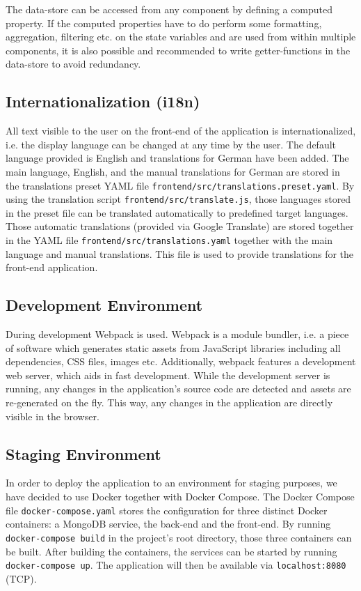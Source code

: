 The data-store can be accessed from any component by defining a computed property. If the computed properties have to do perform some formatting, aggregation, filtering etc. on the state variables and are used from within multiple components, it is also possible and recommended to write getter-functions in the data-store to avoid redundancy.

\subsection{Internationalization (i18n)}

All text visible to the user on the front-end of the application is internationalized, i.e. the display language can be changed at any time by the user. The default language provided is English and translations for German have been added. The main language, English, and the manual translations for German are stored in the translations preset YAML file \texttt{frontend/src/translations.preset.yaml}. By using the translation script \texttt{frontend/src/translate.js}, those languages stored in the preset file can be translated automatically to predefined target languages. Those automatic translations (provided via Google Translate) are stored together in the YAML file \texttt{frontend/src/translations.yaml} together with the main language and manual translations. This file is used to provide translations for the front-end application. 


\subsection{Development Environment}
During development Webpack is used. Webpack is a module bundler, i.e. a piece of software which generates static assets from JavaScript libraries including all dependencies, CSS files, images etc. Additionally, webpack features a development web server, which aids in fast development. While the development server is running, any changes in the application's source code are detected and assets are re-generated on the fly. This way, any changes in the application are directly visible in the browser.


\subsection{Staging Environment}
In order to deploy the application to an environment for staging purposes, we have decided to use Docker together with Docker Compose. The Docker Compose file \texttt{docker-compose.yaml} stores the configuration for three distinct Docker containers: a MongoDB service, the back-end and the front-end. By running \texttt{docker-compose build} in the project's root directory, those three containers can be built. After building the containers, the services can be started by running \texttt{docker-compose up}. The application will then be available via \texttt{localhost:8080} (TCP).

